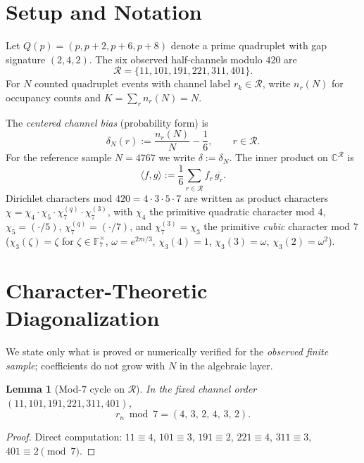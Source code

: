 \documentclass[11pt,a4paper]{article}
\newtheorem{lemma}[theorem]{Lemma}
\newcommand{\R}{\mathcal{R}}
\begin{document}
\section{Setup and Notation}

Let $Q(p)=(p,p+2,p+6,p+8)$ denote a prime quadruplet with gap signature
$(2,4,2)$.
The six observed half-channels modulo $420$ are
\[
  \R = \{11,101,191,221,311,401\}.
\]
For $N$ counted quadruplet events with channel label $r_k\in\R$, write
$n_r(N)$ for occupancy counts and $K=\sum_r n_r(N)=N$.

The \emph{centered channel bias} (probability form) is
\[
  \delta_N(r) := \frac{n_r(N)}{N} - \frac{1}{6},
  \qquad r\in\R.
\]
For the reference sample $N=4767$ we write $\delta:=\delta_N$.
The inner product on $\mathbb{C}^{\R}$ is
\[
  \langle f,g\rangle := \frac{1}{6}\sum_{r\in\R} f_r\,\overline{g_r}.
\]
Dirichlet characters mod $420=4\cdot 3\cdot 5\cdot 7$ are written as
product characters $\chi=\chi_4\cdot\chi_5\cdot\chi_7^{(q)}\cdot\chi_7^{(3)}$,
with $\chi_4$ the primitive quadratic character mod $4$,
$\chi_5=(\cdot/5)$, $\chi_7^{(q)}=(\cdot/7)$, and $\chi_7^{(3)}=\chi_3$
the primitive \emph{cubic} character mod $7$
($\chi_3(\zeta)=\zeta$ for $\zeta\in\mathbb{F}_7^\times$,
$\omega=e^{2\pi i/3}$, $\chi_3(4)=1$, $\chi_3(3)=\omega$, $\chi_3(2)=\omega^2$).

\section{Character-Theoretic Diagonalization}
\label{sec:diagonalization}

We state only what is proved or numerically verified for the \emph{observed
finite sample}; coefficients do not grow with $N$ in the algebraic layer.

\begin{lemma}[Mod-$7$ cycle on $\R$]
\label{lem:mod7-cycle}
In the fixed channel order $(11,101,191,221,311,401)$,
\[
  r_n \bmod 7 = (4,\,3,\,2,\,4,\,3,\,2).
\]
\end{lemma}

\begin{proof}
Direct computation:
$11\equiv 4$, $101\equiv 3$, $191\equiv 2$,
$221\equiv 4$, $311\equiv 3$, $401\equiv 2 \pmod{7}$.
\end{proof}
\end{document}
